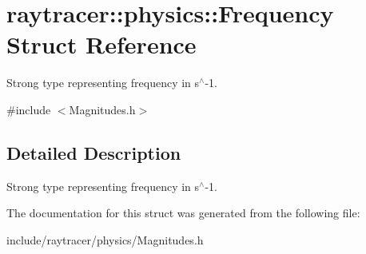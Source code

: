 \hypertarget{structraytracer_1_1physics_1_1Frequency}{}\section{raytracer\+:\+:physics\+:\+:Frequency Struct Reference}
\label{structraytracer_1_1physics_1_1Frequency}


Strong type representing frequency in s$^\wedge$-\/1.  




{\ttfamily \#include $<$Magnitudes.\+h$>$}



\subsection{Detailed Description}
Strong type representing frequency in s$^\wedge$-\/1. 



The documentation for this struct was generated from the following file\+:\begin{DoxyCompactItemize}
\item 
include/raytracer/physics/Magnitudes.\+h\end{DoxyCompactItemize}
